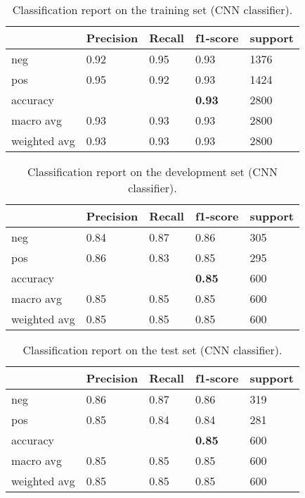 \documentclass[10pt, a4paper]{article}
\begin{document}
	\begin{table}
		\begin{tabular}{|l|l|l|l|l|}
			\hline
			\cellcolor{blue!25}\textbf{} & \cellcolor{blue!25}\textbf{Precision} &
			\cellcolor{blue!25}\textbf{Recall}  &
			\cellcolor{blue!25}\textbf{f1-score}  &
			\cellcolor{blue!25}\textbf{support}\\
			\hline
			neg & 0.92 & 0.95 & 0.93 & 1376 \\\hline
			pos & 0.95  & 0.92 & 0.93 & 1424 \\\hline
			accuracy & & & \textbf{0.93} & 2800 \\\hline
			macro avg & 0.93 & 0.93 & 0.93 & 2800 \\\hline
			weighted avg & 0.93 & 0.93 & 0.93 & 2800 \\\hline
			
		\end{tabular}
		\centering
		\caption{Classification report on the training set (CNN classifier).}
		\label{tab::ex-2-report-train}
	\end{table}
	
	\begin{table}
		\begin{tabular}{|l|l|l|l|l|}
			\hline
			\cellcolor{blue!25}\textbf{} & \cellcolor{blue!25}\textbf{Precision} &
			\cellcolor{blue!25}\textbf{Recall}  &
			\cellcolor{blue!25}\textbf{f1-score}  &
			\cellcolor{blue!25}\textbf{support}\\
			\hline
			neg & 0.84 & 0.87 & 0.86 & 305 \\\hline
			pos & 0.86  & 0.83 & 0.85 & 295 \\\hline
			accuracy & & & \textbf{0.85} & 600 \\\hline
			macro avg & 0.85 & 0.85 & 0.85 & 600 \\\hline
			weighted avg & 0.85 & 0.85 & 0.85 & 600 \\\hline
			
		\end{tabular}
		\centering
		\caption{Classification report on the development set (CNN classifier).}
		\label{tab::ex-2-report-dev}
	\end{table}
	
	\begin{table}
		\begin{tabular}{|l|l|l|l|l|}
			\hline
			\cellcolor{blue!25}\textbf{} & \cellcolor{blue!25}\textbf{Precision} &
			\cellcolor{blue!25}\textbf{Recall}  &
			\cellcolor{blue!25}\textbf{f1-score}  &
			\cellcolor{blue!25}\textbf{support}\\
			\hline
			neg & 0.86 & 0.87 & 0.86 & 319 \\\hline
			pos & 0.85  & 0.84 & 0.84 & 281 \\\hline
			accuracy & & & \textbf{0.85} & 600 \\\hline
			macro avg & 0.85 & 0.85 & 0.85 & 600 \\\hline
			weighted avg & 0.85 & 0.85 & 0.85 & 600 \\\hline
			
		\end{tabular}
		\centering
		\caption{Classification report on the test set (CNN classifier).}
		\label{tab::ex-2-report-test}
	\end{table}
	
\end{document}
